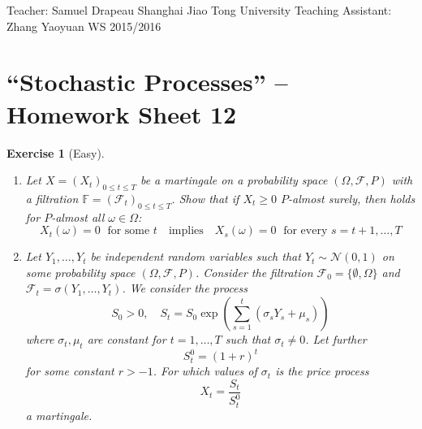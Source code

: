 \documentclass[DIV=classic,a4paper,10pt]{scrartcl}
\newtheorem{exercise}[theorem]{Exercise}
\theoremstyle{nonumberplain}
\numberwithin{equation}{section}
\begin{document}
\noindent
Teacher: Samuel Drapeau \hfill Shanghai Jiao Tong University \newline
Teaching Assistant: Zhang Yaoyuan \hfill WS 2015/2016

\smallskip
\noindent
\hrulefill

\smallskip

\setcounter{section}{12}

\pagestyle{empty}


\section*{``Stochastic Processes'' -- Homework Sheet 12}
\thispagestyle{empty}



\begin{exercise}[Easy]
    \begin{enumerate}[label=\arabic*), fullwidth]
        \item Let $X=(X_t)_{0\leq t\leq T}$ be a martingale on a probability space $(\Omega,\mathcal{F},P)$ with a filtration $\mathbb{F}=(\mathcal{F}_t)_{0\leq t\leq T}$.
            Show that if $X_t\geq 0$ $P$-almost surely, then holds for $P$-almost all $\omega \in \Omega$:
                    \begin{equation*}
                        X_t(\omega)=0\; \text{ for some }t\quad\text{implies}\quad X_{s}(\omega)=0\;\text{ for every }s=t+1,\ldots,T
                    \end{equation*}
        \item Let $Y_1,\ldots,Y_t$ be independent random variables such that $Y_t\sim \mathcal{N}(0,1)$ on some probability space $(\Omega,\mathcal{F},P)$.
            Consider the filtration $\mathcal{F}_0=\{\emptyset,\Omega\}$ and $\mathcal{F}_t=\sigma(Y_1,\ldots,Y_t)$.
            We consider the process
            \begin{equation*}
                S_0>0,\quad S_t=S_0\exp\left( \sum_{s=1}^t \left(\sigma_s Y_s +\mu_s\right) \right)
            \end{equation*}
            where $\sigma_t, \mu_t$ are constant for $t=1,\ldots,T$ such that $\sigma_t\neq 0$.
            Let further
            \begin{equation*}
                S_t^0=(1+r)^t
            \end{equation*}
            for some constant $r>-1$.
            For which values of $\sigma_t$ is the price process
            \begin{equation*}
                X_t=\frac{S_t}{S_t^0}
            \end{equation*}
            a martingale.
    \end{enumerate}
\end{exercise}
\end{document}
